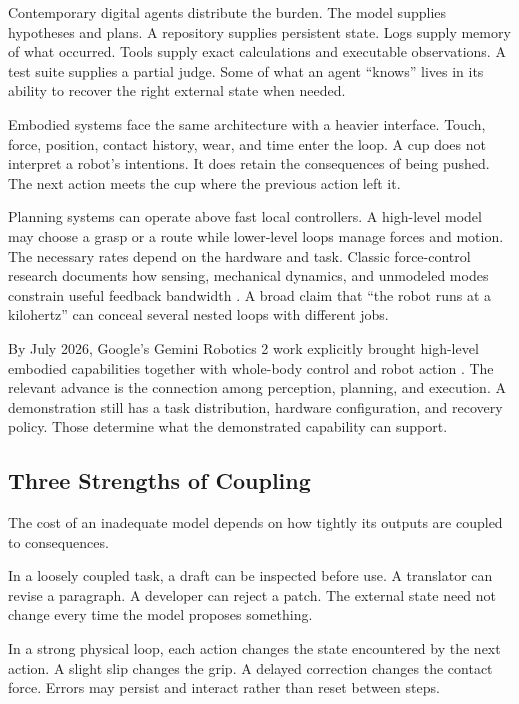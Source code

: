 \documentclass[11pt,openany]{book}
\begin{document}
Contemporary digital agents distribute the burden. The model supplies hypotheses and plans. A repository supplies persistent state. Logs supply memory of what occurred. Tools supply exact calculations and executable observations. A test suite supplies a partial judge. Some of what an agent “knows” lives in its ability to recover the right external state when needed.

Embodied systems face the same architecture with a heavier interface. Touch, force, position, contact history, wear, and time enter the loop. A cup does not interpret a robot's intentions. It does retain the consequences of being pushed. The next action meets the cup where the previous action left it.

Planning systems can operate above fast local controllers. A high-level model may choose a grasp or a route while lower-level loops manage forces and motion. The necessary rates depend on the hardware and task. Classic force-control research documents how sensing, mechanical dynamics, and unmodeled modes constrain useful feedback bandwidth \cite{eppinger1987}. A broad claim that “the robot runs at a kilohertz” can conceal several nested loops with different jobs.

By July 2026, Google's Gemini Robotics 2 work explicitly brought high-level embodied capabilities together with whole-body control and robot action \cite{geminirobotics2026}. The relevant advance is the connection among perception, planning, and execution. A demonstration still has a task distribution, hardware configuration, and recovery policy. Those determine what the demonstrated capability can support.

\subsection{Three Strengths of Coupling}

The cost of an inadequate model depends on how tightly its outputs are coupled to consequences.

In a loosely coupled task, a draft can be inspected before use. A translator can revise a paragraph. A developer can reject a patch. The external state need not change every time the model proposes something.

In a strong physical loop, each action changes the state encountered by the next action. A slight slip changes the grip. A delayed correction changes the contact force. Errors may persist and interact rather than reset between steps.
\end{document}
